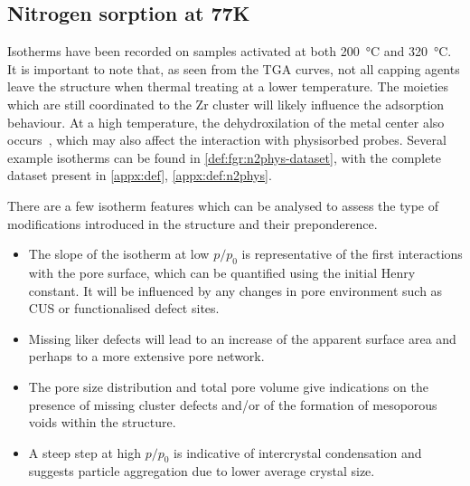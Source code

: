 
\subsection{Nitrogen sorption at 77K}

Isotherms have been recorded on samples activated at both
\SI{200}{\degreeCelsius} and \SI{320}{\degreeCelsius}.
It is important to note that, as seen from the TGA curves,
not all capping agents leave the structure when thermal treating
at a lower temperature. The moieties which are still coordinated
to the Zr cluster will likely influence the adsorption
behaviour. At a high temperature, the dehydroxilation of the 
metal center also occurs~\cite{valenzanoDisclosingComplexStructure2011},
which may also affect the interaction with physisorbed probes. 
Several example isotherms can be found in
\autoref{def:fgr:n2phys-dataset}, with the complete dataset
present in \autoref{appx:def}, \autoref{appx:def:n2phys}.

There are a few isotherm features which can be analysed to
assess the type of modifications introduced in the structure
and their preponderence.

\begin{itemize}
	\item The slope of the isotherm at low \(p/p_0\) is representative
	      of the first interactions with the pore surface, which can be
	      quantified using the initial Henry constant. It will be influenced
		  by any changes in pore environment such as CUS or functionalised
		  defect sites.
	\item Missing liker defects will lead to an increase of the
	      apparent surface area and perhaps to a more extensive
	      pore network.
	\item The pore size distribution and total pore volume give
	      indications on the presence of missing cluster defects and/or
	      of the formation of mesoporous voids within the structure.
	\item A steep step at high \(p/p_0\) is indicative of intercrystal
	      condensation and suggests particle aggregation due to lower average
	      crystal size.
\end{itemize}

